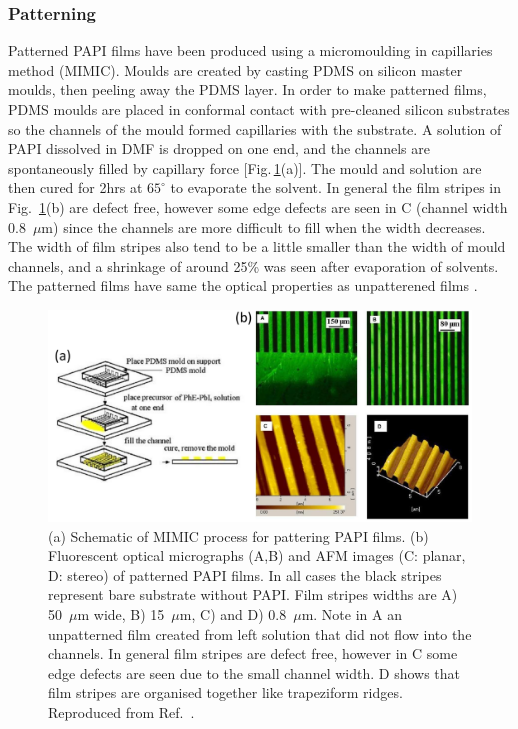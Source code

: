 \subsubsection{Patterning}
Patterned PAPI films have been produced using a micromoulding in capillaries method (MIMIC). Moulds are created by casting PDMS on silicon master moulds, then peeling away the PDMS layer. In order to make patterned films, PDMS moulds are placed in conformal contact with pre-cleaned silicon substrates so the channels of the mould formed capillaries with the substrate. A solution of PAPI dissolved in DMF is dropped on one end, and the channels are spontaneously filled by capillary force [Fig.\,\ref{2Fig11}(a)]. The mould and solution are then cured for 2hrs at $65^{\circ}$ to evaporate the solvent. In general the film stripes in Fig.\ \ref{2Fig11}(b) are defect free, however some edge defects are seen in C (channel width 0.8~$\mu$m) since the channels are more difficult to fill when the width decreases. The width of film stripes also tend to be a little smaller than the width of mould channels, and a shrinkage of around 25\% was seen after evaporation of solvents.  The patterned films have same the optical properties as unpatterened films \cite{Cheng2003}.
\begin{figure} [ht]
\centering
\includegraphics[width=\textwidth]{Fig11}
\caption{(a) Schematic of MIMIC process for pattering PAPI films. (b) Fluorescent optical micrographs (A,B) and AFM images (C: planar, D: stereo) of patterned PAPI films. In all cases the black stripes represent bare substrate without PAPI. Film stripes widths are A) 50~$\mu$m wide, B) 15~$\mu$m, C) and D) 0.8~$\mu$m. Note in A an unpatterned film created from left solution that did not flow into the channels. In general film stripes are defect free, however in C some edge defects are seen due to the small channel width. D shows that film stripes are organised together like trapeziform ridges. Reproduced from Ref.\ \cite{Cheng2003}.}
\label{2Fig11}
\end{figure}



